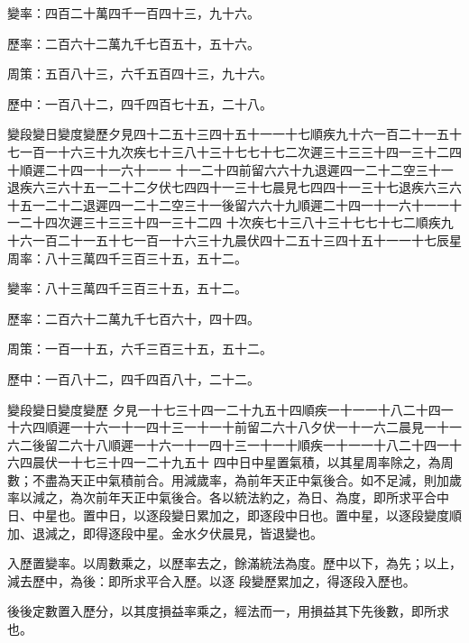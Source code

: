 \begin{pinyinscope}
 變率：四百二十萬四千一百四十三，九十六。



 歷率：二百六十二萬九千七百五十，五十六。



 周策：五百八十三，六千五百四十三，九十六。



 歷中：一百八十二，四千四百七十五，二十八。



 變段變日變度變歷夕見四十二五十三四十五十一一十七順疾九十六一百二十一五十七一百一十六三十九次疾七十三八十三十七七十七二次遲三十三三十四一三十二四十順遲二十四一十一六十一一
 十一二十四前留六六十九退遲四一二十二空三十一退疾六三六十五一二十二夕伏七四四十一三十七晨見七四四十一三十七退疾六三六十五一二十二退遲四一二十二空三十一後留六六十九順遲二十四一十一六十一一十一二十四次遲三十三三十四一三十二四
 十次疾七十三八十三十七七十七二順疾九十六一百二十一五十七一百一十六三十九晨伏四十二五十三四十五十一一十七辰星周率：八十三萬四千三百三十五，五十二。



 變率：八十三萬四千三百三十五，五十二。



 歷率：二百六十二萬九千七百六十，四十四。



 周策：一百一十五，六千三百三十五，五十二。



 歷中：一百八十二，四千四百八十，二十二。



 變段變日變度變歷
 夕見一十七三十四一二十九五十四順疾一十一一十八二十四一十六四順遲一十六一十一四十三一十一十前留二六十八夕伏一十一六二晨見一十一六二後留二六十八順遲一十六一十一四十三一十一十順疾一十一一十八二十四一十六四晨伏一十七三十四一二十九五十
 四中日中星置氣積，以其星周率除之，為周數；不盡為天正中氣積前合。用減歲率，為前年天正中氣後合。如不足減，則加歲率以減之，為次前年天正中氣後合。各以統法約之，為日、為度，即所求平合中日、中星也。置中日，以逐段變日累加之，即逐段中日也。置中星，以逐段變度順加、退減之，即得逐段中星。金水夕伏晨見，皆退變也。



 入歷置變率。以周數乘之，以歷率去之，餘滿統法為度。歷中以下，為先；以上，減去歷中，為後：即所求平合入歷。以逐
 段變歷累加之，得逐段入歷也。



 後後定數置入歷分，以其度損益率乘之，經法而一，用損益其下先後數，即所求也。




\end{pinyinscope}
